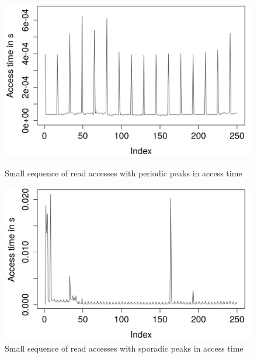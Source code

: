 \documentclass{superfri}
\begin{document}
	\begin{figure}[t]
		\centering
		\begin{minipage}[b]{0.47\textwidth}
			\includegraphics[width=\textwidth]{src/periodic_peaks.png}
			\caption{Small sequence of read accesses with periodic peaks in access time}
			\label{periodic}
		\end{minipage}
		\hfill
		\begin{minipage}[b]{0.47\textwidth}
			\includegraphics[width=\textwidth]{src/sporadic_peaks.png}
			\caption{Small sequence of read accesses with sporadic peaks in access time}
			\label{sporadic}
		\end{minipage}
	\end{figure}
	
\end{document}
